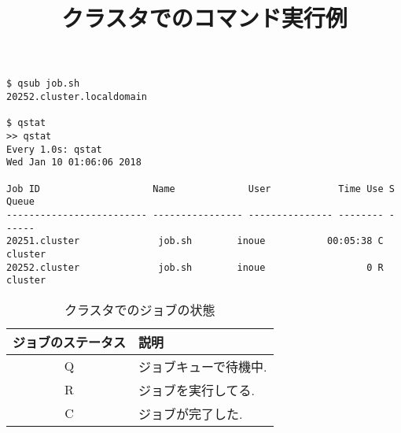 {\footnotesize

}
\vspace{1cm}
\begin{table}[htb]
  \begin{center}
  \title {クラスタでのコマンド実行例}
{\footnotesize
\begin{framed}
\begin{verbatim}
$ qsub job.sh
20252.cluster.localdomain

$ qstat
>> qstat
Every 1.0s: qstat                                                                                                                                            Wed Jan 10 01:06:06 2018

Job ID                    Name             User            Time Use S Queue
------------------------- ---------------- --------------- -------- - -----
20251.cluster              job.sh        inoue           00:05:38 C cluster
20252.cluster              job.sh        inoue                  0 R cluster
\end{verbatim}
\end{framed}
}
\end{center}
\end{table}
\clearpage
\begin{table}[htb]
  \begin{center}
    \caption {クラスタでのジョブの状態}
    \begin{tabular}{|c|p{12cm}|}
      \hline
      ジョブのステータス & 説明 \\ \hline
      Q & ジョブキューで待機中.\\ \hline
      R & ジョブを実行してる.\\ \hline
      C & ジョブが完了した.\\ \hline
    \end{tabular}
  \end{center}
\end{table}
